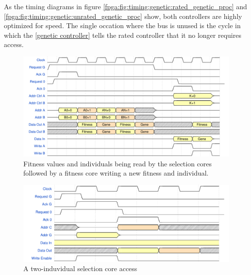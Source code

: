 As the timing diagrams in figure \vref{fpga:fig:timing:genetic:rated_genetic_proc} and \vref{fpga:fig:timing:genetic:unrated_genetic_proc} show, both controllers are highly optimized for speed. The single occation where the bus is unused is the cycle in which the \ref{genetic controller} tells the \gls{rated controller} that it no longer requires access.

\begin{figure}[H]
  \centering
  \includegraphics[width=\textwidth]{fpga/fig/timing/rated_genetic_proc.pdf}
  \caption{Fitness values and individuals being read by the selection cores followed by a fitness core writing a new fitness and individual.}
  \label{fpga:fig:timing:genetic:rated_genetic_proc}
\end{figure}

\begin{figure}[H]
  \centering
  \includegraphics[width=\textwidth]{fpga/fig/timing/unrated_genetic_proc.pdf}
  \caption{A two-induvidual selection core access }
  \label{fpga:fig:timing:genetic:unrated_genetic_proc}
\end{figure}


